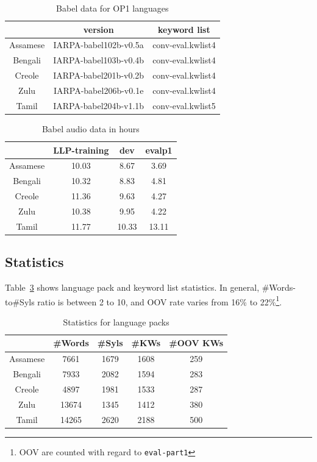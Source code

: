 \documentclass[journal]{IEEEtran}
\begin{document}
\begin{table}[!t]
  \caption{Babel data for OP1 languages}
  \label{tab:version}
  \centering
  \begin{tabular}{ccc}
    \hline
              & version & keyword list\\
    \hline
    Assamese  & IARPA-babel102b-v0.5a & conv-eval.kwlist4\\
    Bengali   & IARPA-babel103b-v0.4b & conv-eval.kwlist4\\
    Creole    & IARPA-babel201b-v0.2b & conv-eval.kwlist4\\
    Zulu      & IARPA-babel206b-v0.1e & conv-eval.kwlist4\\
    Tamil     & IARPA-babel204b-v1.1b & conv-eval.kwlist5\\
    \hline
  \end{tabular}
\end{table}

\begin{table}[!t]
  \caption{Babel audio data in hours}
  \label{tab:hours}
  \centering
  \begin{tabular}{cccc}
    \hline
              & LLP-training & dev & evalp1 \\
    \hline
    Assamese  & 10.03   & 8.67  & 3.69 \\
    Bengali   & 10.32   & 8.83  & 4.81 \\
    Creole    & 11.36   & 9.63  & 4.27 \\
    Zulu      & 10.38   & 9.95  & 4.22 \\
    Tamil     & 11.77   & 10.33 & 13.11 \\
    \hline
  \end{tabular}
\end{table}

\subsection{Statistics}
Table~\ref{tab:stats} shows language pack and keyword list statistics. In general, \#Words-to\#Syls ratio is 
between 2 to 10, and OOV rate varies from 16\% to 22\%\footnote{OOV are counted with regard to \texttt{eval-part1}}.

\begin{table}[!t]
  \caption{Statistics for language packs}
  \label{tab:stats}
  \centering
  \begin{tabular}{ccccc}
    \hline
              & \#Words & \#Syls & \#KWs  & \#OOV KWs \\
    \hline
    Assamese  & 7661    & 1679   & 1608   & 259\\
    Bengali   & 7933    & 2082   & 1594   & 283\\
    Creole    & 4897    & 1981   & 1533   & 287\\
    Zulu      & 13674   & 1345   & 1412   & 380\\
    Tamil     & 14265   & 2620   & 2188   & 500\\
    \hline
  \end{tabular}
\end{table}
\end{document}
